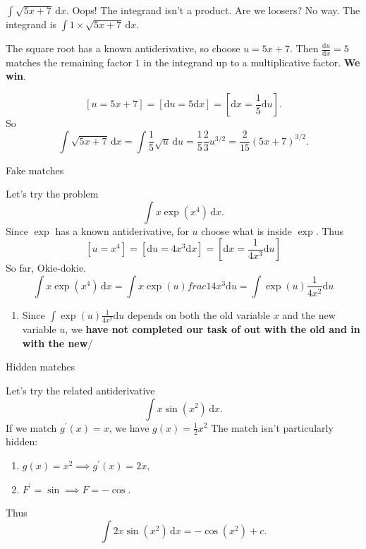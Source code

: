 \documentclass[fleqn]{beamer}
\theoremstyle{definition}
\newenvironment{checklist}{
  \begin{enumerate}[\ding{51}]
    \addtolength{\itemsep}{-0.0\itemsep}}
  {\end{enumerate}}
\begin{document}
\begin{frame}

\( \int  \sqrt{5 x + 7}  \, \mathrm{d} x \).    Oops! The integrand isn't a product. Are we loosers?  No way.   The integrand is \( \int 1 \times  \sqrt{5 x + 7}  \, \mathrm{d} x \). 

The square root has a known antiderivative, so choose \(u = 5 x + 7\). Then \(\frac{\mathrm{d} u}{\mathrm{d} x} = 5 \) matches the remaining factor  \(1\) in the integrand 
 up to a multiplicative factor. \textbf{We win}.
 
 
\[
    [u = 5 x + 7] = [\mathrm{d} u = 5   \mathrm{d} x] = \left[  \mathrm{d} x =  \frac{1}{5}  \mathrm{d} u \right].
\]
So
\[
   \int  \sqrt{5 x + 7}  \, \mathrm{d} x    =  \int \frac{1}{5} \sqrt{u} \, \mathrm{d} u =  \frac{1}{5}    \frac{2}{3} u^{3/2} =  \frac{2}{15}  (5 x + 7)^{3/2}.
\]



\end{frame}

\begin{frame}{Fake  matches}

Let's try the problem
\[
   \int  x \exp(x^4) \, \mathrm{d} x.
\]
Since \(\exp\) has a known antiderivative, for \(u\) choose what is inside \(\exp\). Thus
\[
   [u = x^4 ] = [\mathrm{d} u = 4 x^3 \mathrm{d} x] = \left[   \mathrm{d} x =  \frac{1}{4 x^3} \mathrm{d} u \right]
\]
So far, Okie-dokie.
\[
   \int  x \exp(x^4) \, \mathrm{d} x = \int x \exp(u)  frac{1}{4 x^3} \mathrm{d} u = \int  \exp(u)  \frac{1}{4 x^2} \mathrm{d} u
\]

\begin{checklist}

\item Since   \(\int  \exp(u)  \frac{1}{4 x^2} \mathrm{d} u \) depends on both the old variable \(x\) and the new variable \(u\), we \textbf{have not completed our task of out with the old and in with the new}/

\end{checklist}

\end{frame}


\begin{frame}{Hidden matches}


Let's try the related antiderivative
\[
    \int x  \sin(x^2) \, \mathrm{d} x.
\]
If we match \(g^\prime(x) = x \),  we have \(g(x) =  \frac{1}{2} x^2\)
The match isn't particularly hidden:

\begin{checklist}
\item \(g(x) = x^2   \implies g^\prime(x) = 2 x\),
\item \(F^\prime = \sin \implies F = -\cos \).
\end{checklist}

Thus
\[
    \int 2 x  \sin(x^2) \, \mathrm{d} x = -\cos(x^2) + c.
\]
\end{frame} 
\end{document}
